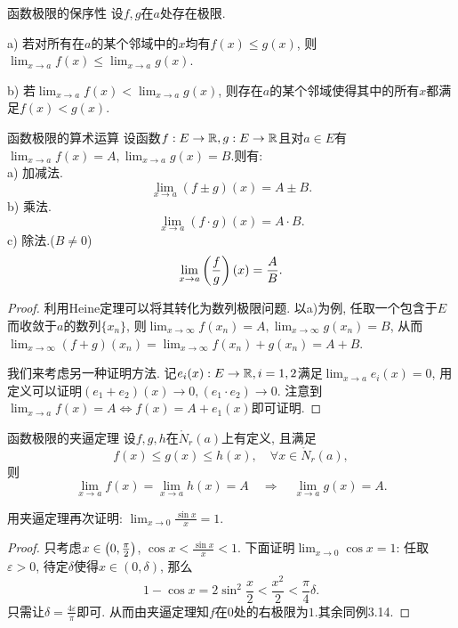 \begin{proposition}{函数极限的保序性}
	设$f,g$在$a$处存在极限.
	
	a) 若对所有在$a$的某个邻域中的$x$均有$f(x) \leq g(x)$, 则$\lim_{x \to a} f(x) \leq \lim_{x \to a} g(x) $.
	
	b) 若$\lim_{x \to a} f(x) < \lim_{x \to a} g(x) $, 则存在$a$的某个邻域使得其中的所有$x$都满足$f(x) < g(x)$. 
\end{proposition}

\begin{theorem}{函数极限的算术运算}
	设函数$f:E \to \mathbb{R}, g:E\to \mathbb{R}$且对$a\in E$有$\lim_{x\to a} f(x) = A, \lim_{x\to a} g(x) = B$.则有:  \\
	a) 加减法. $$\lim_{x\to a} (f\pm g)(x) = A\pm B.$$
	b) 乘法. $$\lim_{x\to a} (f\cdot g)(x) = A \cdot B.$$
	c) 除法.($B\neq 0$) $$\lim_{x\to a} \left( \frac{f}{g} \right)(x) = \frac{A}{B}.$$
\end{theorem}
\begin{proof}
	利用Heine定理可以将其转化为数列极限问题. 以a)为例, 任取一个包含于$E$而收敛于$a$的数列$\{ x_n \}$, 则$\lim_{x\to \infty} f(x_n) = A,\lim_{x\to \infty} g(x_n) = B$, 从而$\lim_{x\to \infty} (f+g)(x_n) = \lim_{x\to \infty} f(x_n)+g(x_n) = A+B$. 
	
	我们来考虑另一种证明方法. 记$e_i(x):E \to \mathbb{R} ,i=1,2$满足$\lim_{x\to a} e_i(x)=0$, 用定义可以证明$(e_1+e_2)(x) \to 0 ,(e_1 \cdot e_2) \to 0$. 注意到$\lim_{x\to a} f(x) = A \Leftrightarrow f(x) = A+e_1(x)$即可证明. 
\end{proof}

\begin{theorem}{函数极限的夹逼定理}
	设$f,g,h$在$\mathring{N}_r(a)$上有定义, 且满足$$f(x) \leq g(x) \leq h(x), \quad \forall x \in \mathring{N}_r(a),$$则$$\lim_{x\to a}f(x) = \lim_{x\to a}h(x) = A \quad \Rightarrow \quad \lim_{x\to a}g(x)=A.$$
\end{theorem}

\begin{example}
	用夹逼定理再次证明: $\lim_{x\to 0} \frac{\sin x}{x} = 1$.
\end{example}
\begin{proof}
	只考虑$x\in \left( 0,\frac{\pi}{2} \right)$, $\cos x < \frac{\sin x}{x} < 1$. 下面证明$\lim_{x\to 0}\cos x=1$: 任取$\varepsilon >0$, 待定$\delta$使得$x \in (0,\delta)$, 那么$$1-\cos x = 2\sin ^2 \frac{x}{2} < \frac{x^2}{2}<\frac{\pi}{4}\delta .$$只需让$\delta = \frac{4\varepsilon}{\pi}$即可. 从而由夹逼定理知$f$在$0$处的右极限为$1$.其余同例3.14. 
\end{proof}



